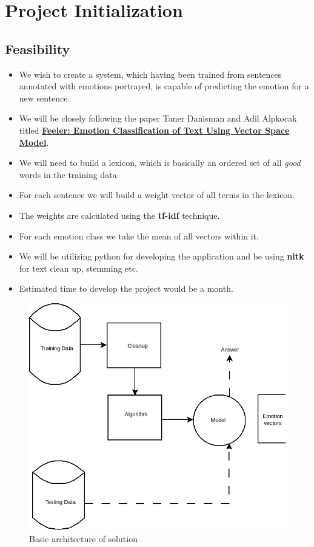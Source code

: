 \chapter{Project Initialization}
\section{Feasibility}
\label{sec-feasibility}
\begin{itemize}
\item We wish to create a system, which having been trained from sentences annotated with emotions portrayed, is capable of predicting the emotion for a new sentence.
\item We will be closely following the paper Taner Danisman and Adil Alpkocak titled \href{http://people.cs.deu.edu.tr/alpkocak/Papers/AISB08.pdf}{\textbf{Feeler: Emotion Classification of Text Using Vector Space Model}}.
\item We will need to build a lexicon, which is basically an ordered set of all \emph{good} words in the training data.
\item For each sentence we will build a weight vector of all terms in the lexicon.
\item The weights are calculated using the \textbf{tf-idf} technique.
\item For each emotion class we take the mean of all vectors within it.
\item We will be utilizing python for developing the application and be using \textbf{nltk} for text clean up, stemming etc.
\item Estimated time to develop the project would be a month.
\end{itemize}
\begin{center}
	\begin{figure}[ht!]
	\caption{Basic architecture of solution}
	\includegraphics[scale=0.5]{ml.png}
	\end{figure}
\end{center}
